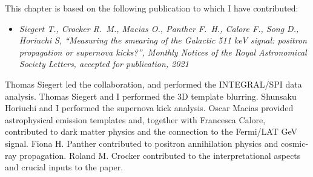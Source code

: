\documentclass[doublespace,nopageskip]{VTthesis} %
\begin{document}
This chapter is based on the following publication to which I have contributed:
\begin{itemize}
    \item \emph{Siegert T., Crocker R.~M., Macias O., Panther F.~H., Calore F., Song D., Horiuchi S, “Measuring the smearing of the Galactic 511 keV signal: positron propagation or supernova kicks?”, Monthly Notices of the Royal Astronomical Society Letters, accepted for publication, 2021}
\end{itemize}
Thomas Siegert led the collaboration, and performed the INTEGRAL/SPI data analysis.
%
Thomas Siegert and I performed the 3D template blurring. Shunsaku Horiuchi and I performed the supernova kick analysis.
%
Oscar Macias provided astrophysical emission templates and, together with Francesca Calore, contributed to dark matter physics and the connection to the Fermi/LAT GeV signal.
%
Fiona H. Panther contributed to positron annihilation physics and cosmic-ray propagation.
%
Roland M. Crocker contributed to the interpretational aspects and crucial inputs to the paper.
\end{document}

